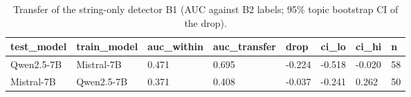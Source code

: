 \begin{table}[t]
\centering
\small
\setlength{\tabcolsep}{3pt}
\caption{Transfer of the string-only detector B1 (AUC against B2 labels; 95\% topic bootstrap CI of the drop).}
\label{tab:transfer}
\begin{tabular}{llllllll}
\toprule
test\_model & train\_model & auc\_within & auc\_transfer & drop & ci\_lo & ci\_hi & n \\
\midrule
Qwen2.5-7B & Mistral-7B & 0.471 & 0.695 & -0.224 & -0.518 & -0.020 & 58 \\
Mistral-7B & Qwen2.5-7B & 0.371 & 0.408 & -0.037 & -0.241 & 0.262 & 50 \\
\bottomrule
\end{tabular}
\end{table}
